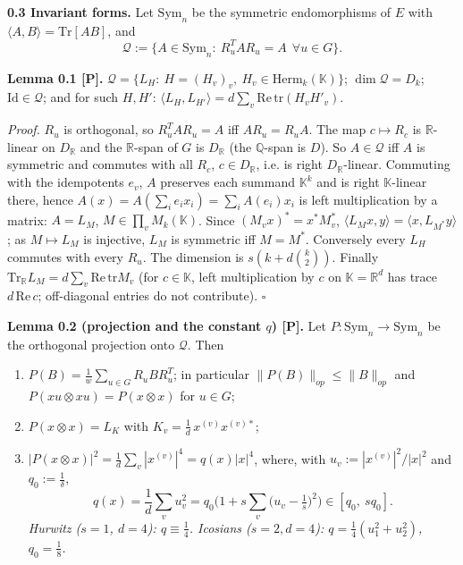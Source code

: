 \textbf{0.3 Invariant forms.} Let \(\mathrm{Sym}_n\) be the symmetric endomorphisms of \(E\) with \(\langle A,B\rangle=\mathrm{Tr}[AB]\), and
\[\mathcal Q:=\{A\in\mathrm{Sym}_n:\ R_u^{T}AR_u=A\ \ \forall u\in G\}.\]

\textbf{Lemma 0.1 {[}P{]}.} \(\mathcal Q=\{L_H:\ H=(H_v)_v,\ H_v\in\mathrm{Herm}_k(\mathbb K)\}\); \(\dim\mathcal Q=D_k\); \(\mathrm{Id}\in\mathcal Q\); and for such \(H,H'\):
\(\langle L_H,L_{H'}\rangle=d\sum_v\mathrm{Re\,tr}(H_vH'_v)\).

\emph{Proof.} \(R_u\) is orthogonal, so \(R_u^TAR_u=A\) iff \(AR_u=R_uA\). The map \(c\mapsto R_c\) is \(\mathbb R\)-linear on \(D_{\mathbb R}\) and the \(\mathbb R\)-span of \(G\) is
\(D_{\mathbb R}\) (the \(\mathbb Q\)-span is \(D\)). So \(A\in\mathcal Q\) iff \(A\) is symmetric and commutes with all \(R_c\), \(c\in D_{\mathbb R}\), i.e. is right \(D_{\mathbb R}\)-linear.
Commuting with the idempotents \(e_v\), \(A\) preserves each summand \(\mathbb K^k\) and is right \(\mathbb K\)-linear there, hence \(A(x)=A(\sum_ie_ix_i)=\sum_iA(e_i)x_i\)
is left multiplication by a matrix: \(A=L_M\), \(M\in\prod_vM_k(\mathbb K)\). Since \((M_vx)^*=x^*M_v^*\), \(\langle L_Mx,y\rangle=\langle x,L_{M^*}y\rangle\); as
\(M\mapsto L_M\) is injective, \(L_M\) is symmetric iff \(M=M^*\). Conversely every \(L_H\) commutes with every \(R_u\). The dimension is \(s(k+d\binom k2)\).
Finally \(\mathrm{Tr}_{\mathbb R}L_M=d\sum_v\mathrm{Re\,tr}M_v\) (for \(c\in\mathbb K\), left multiplication by \(c\) on \(\mathbb K=\mathbb R^d\) has trace \(d\,\mathrm{Re}\,c\);
off-diagonal entries do not contribute). \(\square\)

\textbf{Lemma 0.2 (projection and the constant \(q\)) {[}P{]}.} Let \(P:\mathrm{Sym}_n\to\mathrm{Sym}_n\) be the orthogonal projection onto \(\mathcal Q\). Then

\begin{enumerate}
\def\labelenumi{(\alph{enumi})}
\tightlist
\item
  \(P(B)=\frac1w\sum_{u\in G}R_uBR_u^T\); in particular \(\|P(B)\|_{op}\le\|B\|_{op}\) and \(P(xu\otimes xu)=P(x\otimes x)\) for \(u \in G\);
\item
  \(P(x\otimes x)=L_{K}\) with \(K_v=\frac1d\,x^{(v)}x^{(v)*}\);
\item
  \(|P(x\otimes x)|^2=\frac1d\sum_v|x^{(v)}|^4=q(x)|x|^4\), where, with \(u_v:=|x^{(v)}|^2/|x|^2\) and \(q_0:=\frac1{\delta}\),
  \[q(x)=\frac1d\sum_vu_v^2=q_0\Big(1+s\sum_{v}\big(u_v-\tfrac1s\big)^2\Big)\in[q_0,\ sq_0].\]
  \emph{Hurwitz (\(s=1\), \(d=4\)): \(q\equiv\frac14\). Icosians (\(s=2,d=4\)): \(q=\frac14(u_1^2+u_2^2)\), \(q_0=\frac18\).}
\end{enumerate}


